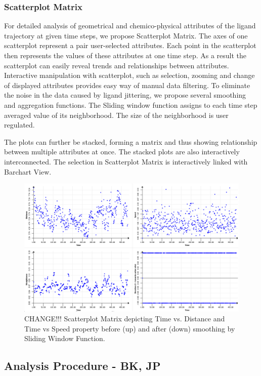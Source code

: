 \documentclass[twocolumn]{bmcart}%
\begin{document}
\subsubsection*{Scatterplot Matrix}
For detailed analysis of geometrical and chemico-physical attributes of the ligand trajectory at given time steps, we propose Scatterplot Matrix.
The axes of one scatterplot represent a pair user-selected attributes.
Each point in the scatterplot then represents the values of these attributes at one time step.
As a result the scatterplot can easily reveal trends and relationships between attributes.
Interactive manipulation with scatterplot, such as selection, zooming and change of displayed attributes provides easy way of manual data filtering. 
To eliminate the noise in the data caused by ligand jittering, we propose several smoothing and aggregation functions.
The Sliding window function assigns to each time step averaged value of its neighborhood.
The size of the neighborhood is user regulated. 

The plots can further be stacked, forming a matrix and thus showing relationship between multiple attributes at once.
The stacked plots are also interactively interconnected.
The selection in Scatterplot Matrix is interactively linked with Barchart View.

\begin{figure}[htb]
	\centering
  \includegraphics[width=0.95\linewidth]{img/scatterplot.png}
  \caption{\label{fig:scatterplot} CHANGE!!! Scatterplot Matrix depicting Time vs. Distance and Time vs Speed property before (up) and after (down) smoothing by Sliding Window Function.}
\end{figure}


\subsection*{Analysis Procedure - BK, JP}
\end{document}
